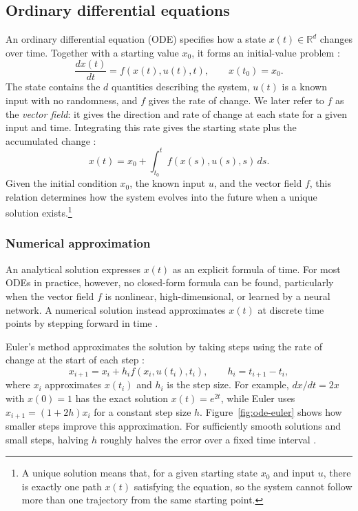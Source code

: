 \subsection{Ordinary differential equations}
\label{sec:ode-theory}

An ordinary differential equation (ODE) specifies how a state
$x(t)\in\mathbb{R}^{d}$ changes over time. Together with a starting value $x_0$,
it forms an initial-value problem \parencite{kohler2014elementary}:
\begin{equation}
    \frac{dx(t)}{dt}=f(x(t),u(t),t),\qquad x(t_0)=x_0.
    \label{eq:ode}
\end{equation}
The state contains the $d$ quantities describing the system, $u(t)$ is a known
input with no randomness, and $f$ gives the rate of change. We later refer to
$f$ as the \emph{vector field}: it gives the direction and rate of change at
each state for a given input and time. Integrating this rate gives the
starting state plus the accumulated change
\parencite{thomas2003thomas}:
\begin{equation}
    x(t)=x_0+\int_{t_0}^{t}f(x(s),u(s),s)\,ds.
    \label{eq:ode-integral}
\end{equation}
Given the initial condition $x_0$, the known input $u$, and the vector field
$f$, this relation determines how the system evolves into the future when a
unique solution exists.\footnote{A unique solution means that, for a given
starting state $x_0$ and input $u$, there is exactly one path $x(t)$ satisfying
the equation, so the system cannot follow more than one trajectory from the same
starting point.}

\subsubsection{Numerical approximation}

An analytical solution expresses $x(t)$ as an explicit formula of time. For
most ODEs in practice, however, no closed-form formula can be found,
particularly when the vector field $f$ is nonlinear, high-dimensional, or
learned by a neural network. A numerical solution instead approximates $x(t)$
at discrete time points by stepping forward in time
\parencite{kohler2014elementary}.

Euler's method approximates the solution by taking steps using the rate of
change at the start of each step \parencite{kohler2014elementary}:
\begin{equation}
    x_{i+1}=x_i+h_i f(x_i,u(t_i),t_i),\qquad h_i=t_{i+1}-t_i,
    \label{eq:euler-ode}
\end{equation}
where $x_i$ approximates $x(t_i)$ and $h_i$ is the step size. For example,
$dx/dt=2x$ with $x(0)=1$ has the exact solution $x(t)=e^{2t}$, while Euler
uses $x_{i+1}=(1+2h)x_i$ for a constant step size $h$.
Figure~\ref{fig:ode-euler} shows how smaller steps improve this approximation.
For sufficiently smooth solutions and small steps, halving $h$ roughly halves
the error over a fixed time interval \parencite{kohler2014elementary}.

